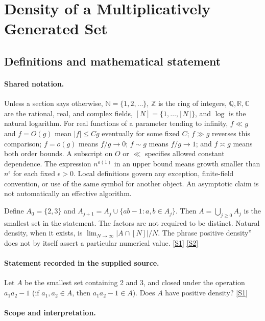 \documentclass[11pt,a4paper]{article}
\newcommand{\N}{\mathbb{N}}
\newcommand{\Z}{\mathbb{Z}}
\newcommand{\Q}{\mathbb{Q}}
\newcommand{\R}{\mathbb{R}}
\newcommand{\C}{\mathbb{C}}
\newcommand{\sref}[2]{\hyperlink{source:#1:#2}{[S#2]}}
\begin{document}
\section{Density of a Multiplicatively Generated Set}\label{statement}


\subsection{Definitions and mathematical statement}

\paragraph{Shared notation.}Unless a section says otherwise, $\N=\{1,2,\ldots\}$,
$\Z$ is the ring of integers, $\Q,\R,\C$ are the rational, real, and complex
fields, $[N]=\{1,\ldots,\lfloor N\rfloor\}$, and $\log$ is the natural
logarithm. For real functions of a parameter tending to infinity,
$f\ll g$ and $f=O(g)$ mean $|f|\leq Cg$ eventually for some fixed $C$;
$f\gg g$ reverses this comparison; $f=o(g)$ means $f/g\to0$;
$f\sim g$ means $f/g\to1$; and $f\asymp g$ means both order bounds.
A subscript on $O$ or $\ll$ specifies allowed constant dependence.
The expression $n^{o(1)}$ in an upper bound means growth smaller than
$n^\epsilon$ for each fixed $\epsilon>0$. Local definitions govern any
exception, finite-field convention, or use of the same symbol for another
object. An asymptotic claim is not automatically an effective algorithm.



Define $A_0=\{2,3\}$ and $A_{j+1}=A_j\cup\{ab-1:a,b\in A_j\}$. Then $A=\bigcup_{j\geq0}A_j$ is the smallest set in the statement. The factors are not required to be distinct. Natural density, when it exists, is $\lim_{N\to\infty}|A\cap[N]|/N$. The phrase positive density'' does not by itself assert a particular numerical value. \sref{statement}{1} \sref{statement}{2}

\paragraph{Statement recorded in the supplied source.}
Let $A$ be the smallest set containing 2 and 3, and closed under the operation $a_1a_2 - 1$ (if $a_1, a_2 \in A$, then $a_1a_2 - 1 \in A$). Does $A$ have positive density? \sref{statement}{1}

\paragraph{Scope and interpretation.}
\end{document}
